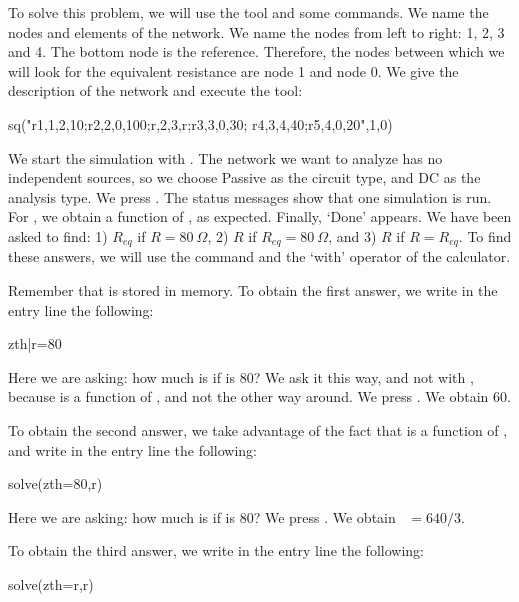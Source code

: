 To solve this problem, we will use the  tool and some
commands. We name the nodes and elements of the network. We name the
nodes from left to right: 1, 2, 3 and 4. The bottom node is the
reference. Therefore, the nodes between which we will look for the
equivalent resistance are node 1 and node 0. We give the description
of the network and execute the tool:

\begin{entry}
sq\thevenin("r1,1,2,10;r2,2,0,100;r,2,3,r;r3,3,0,30;
            r4,3,4,40;r5,4,0,20",1,0)
\end{entry}

We start the simulation with . The network we want to
analyze has no independent sources, so we choose Passive as the
circuit type, and DC as the analysis type. We press . The
status messages show that one simulation is run. For , we
obtain a function of , as expected. Finally, `Done' appears.
We have been asked to find: 1) $R_{eq}$ if $R = 80~\Omega$, 2) $R$
if $R_{eq} = 80~\Omega$, and 3) $R$ if $R = R_{eq}$. To find these
answers, we will use the  command and the `with'
operator of the calculator.

Remember that  is stored in memory. To obtain the first
answer, we write in the entry line the following:

\begin{entry}
zth|r=80
\end{entry}

Here we are asking: how much is  if  is 80? We ask
it this way, and not with , because  is a
function of , and not the other way around. We press
. We obtain 60.

To obtain the second answer, we take advantage of the fact that
 is a function of , and write in the entry line
the following:

\begin{entry}
solve(zth=80,r)
\end{entry}

Here we are asking: how much is  if  is 80? We
press . We obtain ~$= 640/3$.

To obtain the third answer, we write in the entry line the
following:

\begin{entry}
solve(zth=r,r)
\end{entry}

